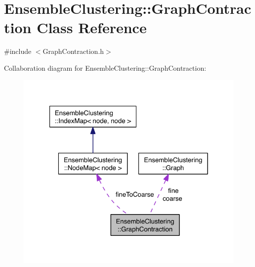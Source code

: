 \hypertarget{class_ensemble_clustering_1_1_graph_contraction}{\section{Ensemble\-Clustering\-:\-:Graph\-Contraction Class Reference}
\label{class_ensemble_clustering_1_1_graph_contraction}
}


{\ttfamily \#include $<$Graph\-Contraction.\-h$>$}



Collaboration diagram for Ensemble\-Clustering\-:\-:Graph\-Contraction\-:
\nopagebreak
\begin{figure}[H]
\begin{center}
\leavevmode
\includegraphics[width=321pt]{class_ensemble_clustering_1_1_graph_contraction__coll__graph}
\end{center}
\end{figure}
